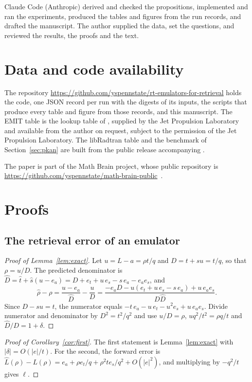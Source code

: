 \documentclass[11pt]{article}
\theoremstyle{remark}
\newcommand{\1}{\mathbf{1}}
\begin{document}
Claude Code (Anthropic) derived and checked the propositions, implemented and ran the experiments, produced the tables
and figures from the run records, and drafted the manuscript. The author supplied the data, set the questions, and
reviewed the results, the proofs and the text.

\section*{Data and code availability}

{\sloppy
The repository \url{https://github.com/yspennstate/rt-emulators-for-retrieval} holds the code, one JSON record per run
with the digests of its inputs, the scripts that produce every table and figure from those records, and this
manuscript. The EMIT table is the lookup table of \cite{shmalo2}, supplied by the Jet Propulsion Laboratory and available
from the author on request, subject to the permission of the Jet Propulsion Laboratory. The libRadtran table and the
benchmark of Section~\ref{sec:pkan} are built from the public release accompanying \cite{pkan}.\par}

The paper is part of the Math Brain project, whose public repository is \url{https://github.com/yspennstate/math-brain-public}~\cite{MathBrainRepo}.

\appendix

\section{Proofs}\label{app:proofs}

\subsection{The retrieval error of an emulator}

\begin{proof}[Proof of Lemma~\ref{lem:exact}]
Let $u=L-a=\rho t/q$ and $D=t+su=t/q$, so that $\rho=u/D$. The predicted denominator is
$\hat D=\hat t+\hat s(u-e_a)=D+e_t+u\,e_s-s\,e_a-e_ae_s$, and
\[
\hat\rho-\rho=\frac{u-e_a}{\hat D}-\frac{u}{D}=\frac{-e_aD-u(e_t+u\,e_s-s\,e_a)+u\,e_ae_s}{D\hat D}.
\]
Since $D-su=t$, the numerator equals $-t\,e_a-u\,e_t-u^2e_s+u\,e_ae_s$. Divide numerator and denominator by
$D^2=t^2/q^2$ and use $u/D=\rho$, $uq^2/t^2=\rho q/t$ and $\hat D/D=1+\delta$.
\end{proof}

\begin{proof}[Proof of Corollary~\ref{cor:first}]
The first statement is Lemma~\ref{lem:exact} with $|\delta|=O(|e|/t)$. For the second, the forward error is
$\hat L(\rho)-L(\rho)=e_a+\rho e_t/q+\rho^2 t e_s/q^2+O(|e|^2)$, and multiplying by $-q^2/t$ gives $\ell$.
\end{proof}
\end{document}

